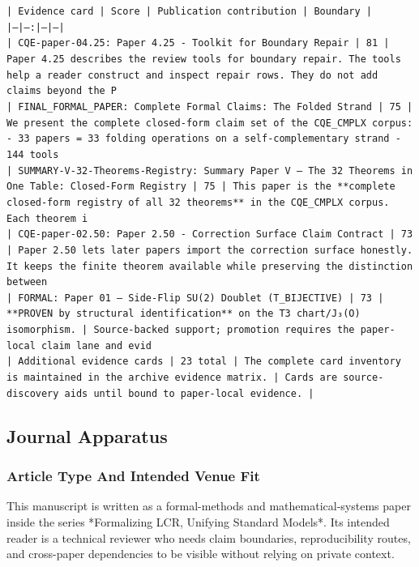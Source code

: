 \documentclass[11pt]{article}
\begin{document}
\noindent\texttt{| Evidence card | Score | Publication contribution | Boundary |}\\
\noindent\texttt{|---|---:|---|---|}\\
\noindent\texttt{| CQE-paper-04.25: Paper 4.25 - Toolkit for Boundary Repair | 81 | Paper 4.25 describes the review tools for boundary repair. The tools help a reader construct and inspect repair rows. They do not add claims beyond the P}\\
\noindent\texttt{| FINAL\_FORMAL\_PAPER: Complete Formal Claims: The Folded Strand | 75 | We present the complete closed-form claim set of the CQE\_CMPLX corpus: - 33 papers = 33 folding operations on a self-complementary strand - 144 tools}\\
\noindent\texttt{| SUMMARY-V-32-Theorems-Registry: Summary Paper V — The 32 Theorems in One Table: Closed-Form Registry | 75 | This paper is the **complete closed-form registry of all 32 theorems** in the CQE\_CMPLX corpus. Each theorem i}\\
\noindent\texttt{| CQE-paper-02.50: Paper 2.50 - Correction Surface Claim Contract | 73 | Paper 2.50 lets later papers import the correction surface honestly. It keeps the finite theorem available while preserving the distinction between}\\
\noindent\texttt{| FORMAL: Paper 01 — Side-Flip SU(2) Doublet (T\_BIJECTIVE) | 73 | **PROVEN by structural identification** on the T3 chart/J₃(O) isomorphism. | Source-backed support; promotion requires the paper-local claim lane and evid}\\
\noindent\texttt{| Additional evidence cards | 23 total | The complete card inventory is maintained in the archive evidence matrix. | Cards are source-discovery aids until bound to paper-local evidence. |}\\

\subsection*{Journal Apparatus}

\subsubsection*{Article Type And Intended Venue Fit}

This manuscript is written as a formal-methods and mathematical-systems paper
inside the series *Formalizing LCR, Unifying Standard Models*. Its intended
reader is a technical reviewer who needs claim boundaries, reproducibility
routes, and cross-paper dependencies to be visible without relying on private
context.
\end{document}
